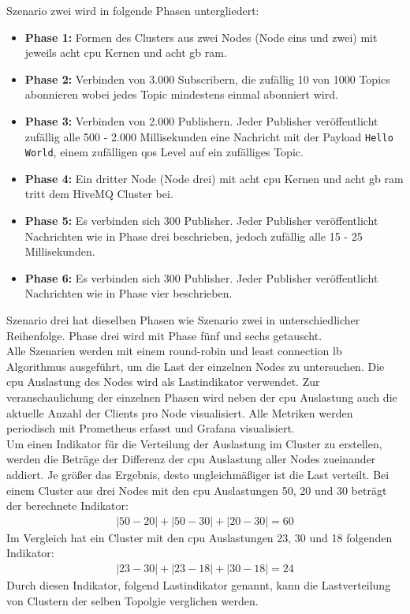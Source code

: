 Szenario zwei wird in folgende Phasen untergliedert:
\begin{itemize}
  \item \textbf{Phase 1:} Formen des Clusters aus zwei Nodes (Node eins und zwei) mit jeweils acht \ac{cpu} Kernen und acht \ac{gb} \ac{ram}.
  \item \textbf{Phase 2:} Verbinden von 3.000 Subscribern, die zufällig 10 von 1000 Topics abonnieren wobei jedes Topic mindestens einmal abonniert wird.
  \item \textbf{Phase 3:} Verbinden von 2.000 Publishern. Jeder Publisher veröffentlicht zufällig alle 500 - 2.000 Millisekunden eine Nachricht mit der Payload \verb|Hello World|, einem zufälligen \ac{qos} Level auf ein zufälliges Topic.
  \item \textbf{Phase 4:} Ein dritter Node (Node drei) mit acht \ac{cpu} Kernen und acht \ac{gb} \ac{ram} tritt dem HiveMQ Cluster bei.
  \item \textbf{Phase 5:} Es verbinden sich 300 Publisher. Jeder Publisher veröffentlicht Nachrichten wie in Phase drei beschrieben, jedoch zufällig alle 15 - 25 Millisekunden.
  \item \textbf{Phase 6:} Es verbinden sich 300 Publisher. Jeder Publisher veröffentlicht Nachrichten wie in Phase vier beschrieben.
\end{itemize}
Szenario drei hat dieselben Phasen wie Szenario zwei in unterschiedlicher Reihenfolge. Phase drei wird mit Phase fünf und sechs getauscht.
\\
Alle Szenarien werden mit einem round-robin und least connection \ac{lb} Algorithmus ausgeführt, um die Last der einzelnen Nodes zu untersuchen. Die \ac{cpu} Auslastung des Nodes wird als Lastindikator verwendet. Zur veranschaulichung der einzelnen Phasen wird neben der \ac{cpu} Auslastung auch die aktuelle Anzahl der Clients pro Node visualisiert.
Alle Metriken werden periodisch mit Prometheus erfasst und Grafana visualisiert.
\\
Um einen Indikator für die Verteilung der Auslastung im Cluster zu erstellen, werden die Beträge der Differenz der \ac{cpu} Auslastung aller Nodes zueinander addiert. Je grö{\ss}er das Ergebnis, desto ungleichmä{\ss}iger ist die Last verteilt.
Bei einem Cluster aus drei Nodes mit den \ac{cpu} Auslastungen 50, 20 und 30 beträgt der berechnete Indikator:
\begin{align}
   |50 - 20| + |50 - 30| + |20 - 30| = 60
\end{align}
Im Vergleich hat ein Cluster mit den \ac{cpu} Auslastungen 23, 30 und 18 folgenden Indikator:
\begin{align}
   |23 - 30| + |23 - 18| + |30 - 18| = 24
\end{align}
Durch diesen Indikator, folgend Lastindikator genannt, kann die Lastverteilung von Clustern der selben Topolgie verglichen werden.

